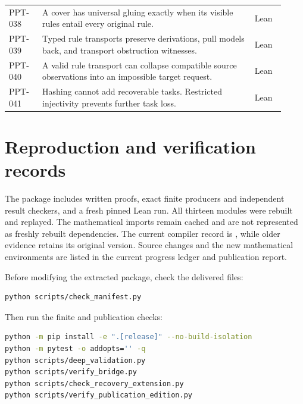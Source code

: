 \documentclass[11pt,oneside]{article}
\theoremstyle{komorebiplain}
\theoremstyle{komorebidefinition}
\theoremstyle{komorebiremark}
\begin{document}
\begin{longtable}{@{}L{0.115\linewidth}L{0.70\linewidth}L{0.105\linewidth}@{}}
PPT-038 & A cover has universal gluing exactly when its visible rules entail every original rule. & {\sffamily\small\color{KomorebiTeal}Lean}\\[2pt]
PPT-039 & Typed rule transports preserve derivations, pull models back, and transport obstruction witnesses. & {\sffamily\small\color{KomorebiTeal}Lean}\\[2pt]
PPT-040 & A valid rule transport can collapse compatible source observations into an impossible target request. & {\sffamily\small\color{KomorebiTeal}Lean}\\[2pt]
PPT-041 & Hashing cannot add recoverable tasks. Restricted injectivity prevents further task loss. & {\sffamily\small\color{KomorebiTeal}Lean}\\[2pt]
\end{longtable}
\renewcommand{\arraystretch}{1.0}
\endgroup

\clearpage
\section{Reproduction and verification records}
\label{app:reproduction}

The package includes written proofs, exact finite producers and independent result checkers, and a fresh pinned Lean run. All thirteen modules were rebuilt and replayed. The mathematical imports remain cached and are not represented as freshly rebuilt dependencies. The current compiler record is , while older evidence retains its original version. Source changes and the new mathematical environments are listed in the current progress ledger and publication report.

Before modifying the extracted package, check the delivered files:
\begin{lstlisting}[language=bash]
python scripts/check_manifest.py
\end{lstlisting}
Then run the finite and publication checks:
\begin{lstlisting}[language=bash]
python -m pip install -e ".[release]" --no-build-isolation
python -m pytest -o addopts='' -q
python scripts/deep_validation.py
python scripts/verify_bridge.py
python scripts/check_recovery_extension.py
python scripts/verify_publication_edition.py
\end{lstlisting}
\end{document}
